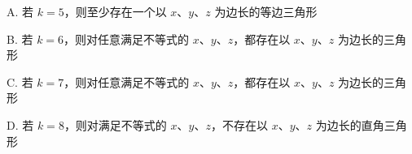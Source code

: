 \documentclass[a4paper,11pt]{article}
\begin{document}
\begin{enumerate}
\keepwithprev
A. 若 $k=5$，则至少存在一个以 $x$、$y$、$z$ 为边长的等边三角形

B. 若 $k=6$，则对任意满足不等式的 $x$、$y$、$z$，都存在以 $x$、$y$、$z$ 为边长的三角形

C. 若 $k=7$，则对任意满足不等式的 $x$、$y$、$z$，都存在以 $x$、$y$、$z$ 为边长的三角形

D. 若 $k=8$，则对满足不等式的 $x$、$y$、$z$，不存在以 $x$、$y$、$z$ 为边长的直角三角形


\ifanswer
\solbegin
{}
\solend

\fi

\end{enumerate}

\end{document}
